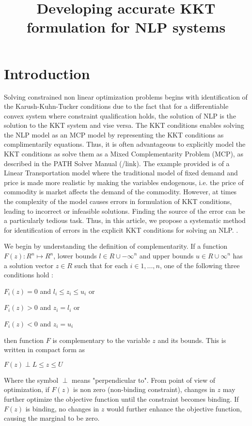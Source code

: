 \documentclass{article}
\title{Developing accurate KKT formulation for NLP systems}
\begin{document}
\section{Introduction}
Solving constrained non linear optimization problems begins with identification of the Karush-Kuhn-Tucker conditions due to the fact that for a differentiable convex system where constraint qualification holds, the solution of NLP is the solution to the KKT system and vise versa. The KKT conditions enables solving the NLP model as an MCP model by representing the KKT conditions as complimentarily equations.  Thus, it is often advantageous to explicitly model the KKT conditions as solve them as a Mixed Complementarity Problem (MCP), as described in the PATH Solver Manual (/link). The example provided is of a Linear Transportation model where the traditional model of fixed demand and price is made more realistic by making the variables endogenous, i.e. the price of commodity is market affects the demand of the commodity.  However, at times the complexity of the model causes errors in formulation of KKT conditions, leading to incorrect or infeasible solutions. Finding the source of the error can be a particularly tedious task. Thus, in this article, we propose a systematic method for identification of errors in the explicit KKT conditions for solving an NLP. . 

We begin by understanding the definition of complementarity. If a function $F(z) : {\!R}^n \mapsto {\!R}^n$, lower bounds $ l \in { \!R \cup {-\infty}}^n$ and upper bounds $ u \in { \!R \cup {\infty}}^n$ has a solution vector $z \in \!R$ such that for each $ i \in {1,...,n}$, one of the following three conditions hold : 

 \centerline{$F_{i}(z) = 0$  and  $ l_i \leq z_i \leq u_i $   or} 
 \centerline{$F_{i}(z) > 0$  and  $ z_i = l_i$  or }
 \centerline{ $F_{i}(z) < 0$  and  $ z_i = u_i$ }

then function $F$ is complementary to the variable $z$ and its bounds. This is written in compact form as 

\centerline{ $ F(z) \perp L \leq z \leq U $ }
\par
\noindent Where the symbol $\perp$ means "perpendicular to".  From point of view of optimization, if $F(z)$ is non zero (non-binding constraint), changes in $z$ may further optimize the objective function until the constraint becomes binding. If $F(z)$ is binding, no changes in $z$ would further enhance the objective function, causing the marginal to be zero. 
\end{document}
